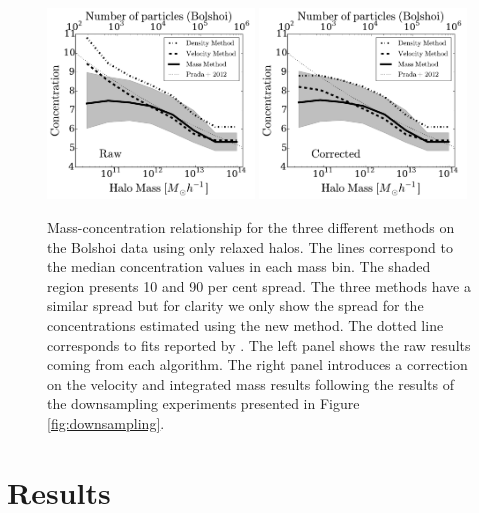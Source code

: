 \documentclass{emulateapj}
\begin{document}
\begin{figure}
\begin{center}
  \includegraphics[width=0.49\textwidth]{concentration_bolshoi.pdf}
  \includegraphics[width=0.49\textwidth]{concentration_bolshoi_corrected.pdf}
\end{center}
\vspace{-0.5cm}
\caption{Mass-concentration relationship for the three different
  methods on the Bolshoi data using only relaxed halos.
  The lines correspond to the median concentration values in each mass
  bin.  
  The shaded region presents 10 and 90 per cent spread. 
  The three methods have a similar spread but for clarity we only show
  the spread for the concentrations estimated using the new method.   
  The dotted line corresponds to fits reported by \citep{Prada2012}.
  The left panel shows the raw results coming from each algorithm. 
  The right panel introduces a correction on the velocity and
  integrated mass results following the results of the downsampling
  experiments presented in Figure 
  \ref{fig:downsampling}.
  \label{fig:concentration}} 
\end{figure}


\section{Results}
\label{sec:results}
\end{document}
